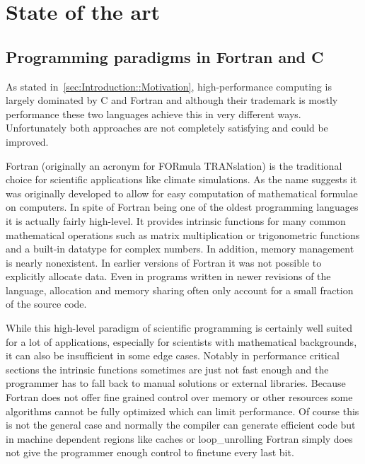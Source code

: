 \chapter{State of the art}
\label{ch:State_of_the_art}


\section{Programming paradigms in Fortran and C}
\label{sec:State_of_the_art::Paradigms}

As stated in~\autoref{sec:Introduction::Motivation}, high-performance computing is largely dominated by C and Fortran and although their trademark is mostly performance these two languages achieve this in very different ways. Unfortunately both approaches are not completely satisfying and could be improved.

Fortran (originally an acronym for FORmula TRANslation) is the traditional choice for scientific applications like climate simulations. As the name suggests it was originally developed to allow for easy computation of mathematical formulae on computers. In spite of Fortran being one of the oldest programming languages it is actually fairly high-level. It provides \gls{intrinsic} functions for many common mathematical operations such as matrix multiplication or trigonometric functions and a built-in datatype for complex numbers. In addition, memory management is nearly nonexistent. In earlier versions of Fortran it was not possible to explicitly allocate data. Even in programs written in newer revisions of the language, allocation and memory sharing often only account for a small fraction of the source code.

While this high-level paradigm of scientific programming is certainly well suited for a lot of applications, especially for scientists with mathematical backgrounds, it can also be insufficient in some edge cases. Notably in performance critical sections the \gls{intrinsic} functions sometimes are just not fast enough and the programmer has to fall back to manual solutions or external libraries. Because Fortran does not offer fine grained control over memory or other resources some algorithms cannot be fully optimized which can limit performance. Of course this is not the general case and normally the compiler can generate efficient code but in machine dependent regions like caches or \gls{loop_unrolling} Fortran simply does not give the programmer enough control to finetune every last bit.


